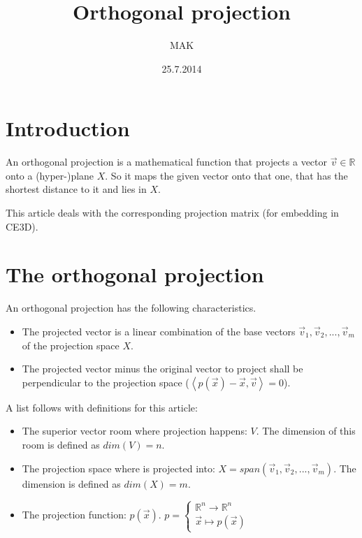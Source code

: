 \documentclass{article}
\newcommand{\lrangle}[1]{\left\langle #1 \right\rangle}
\begin{document}
\title{Orthogonal projection}
\author{MAK}
\date{25.7.2014}

\maketitle

\section{Introduction}

An orthogonal projection is a mathematical function that projects a vector
\(\vec{v}\in\mathbb{R}\) onto a (hyper-)plane \(X\). So it maps the given vector
onto that one, that has the shortest distance to it and lies in \(X\).

This article deals with the corresponding projection matrix (for embedding in
CE3D).

\section{The orthogonal projection}

An orthogonal projection has the following characteristics.

    \begin{itemize}
        \item The projected vector is a linear combination of the base vectors
              \(\vec{v}_1,\vec{v}_2,...,\vec{v}_m\) of the projection space
              \(X\).
        \item The projected vector minus the original vector to project shall be
              perpendicular to the projection space
              (\(\lrangle{ p(\vec{x})-\vec{x},\vec{v} } =0\)).
    \end{itemize}

A list follows with definitions for this article:

    \begin{itemize}
        \item The superior vector room where projection happens: \(V\). The
              dimension of this room is defined as \(dim(V)=n\).
        \item The projection space where is projected into:
              \(X=span(\vec{v}_1,\vec{v}_2,...,\vec{v}_m)\). The dimension is
              defined as \(dim(X)=m\).
        \item The projection function: \(p(\vec{x})\).
              \(p = \left\{\begin{array}{l}\mathbb{R}^n\to \mathbb{R}^n\\\vec{x}
              \mapsto p(\vec{x})\end{array} \right.\)
    \end{itemize}
\end{document}
